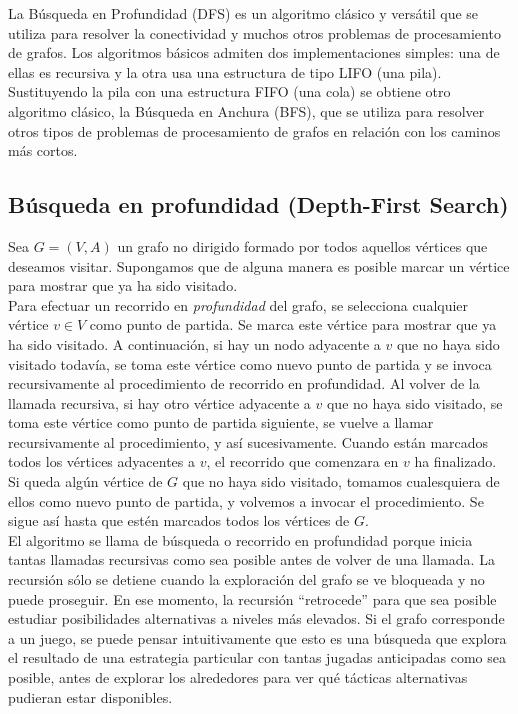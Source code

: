 La Búsqueda en Profundidad (DFS) es un algoritmo clásico y versátil que se utiliza para resolver la conectividad y muchos otros problemas de procesamiento de grafos. Los algoritmos básicos admiten dos implementaciones simples: una de ellas es recursiva y la otra usa una estructura de tipo LIFO (una pila). Sustituyendo la pila con una estructura FIFO (una cola) se obtiene otro algoritmo clásico, la Búsqueda en Anchura (BFS), que se utiliza para resolver otros tipos de problemas de procesamiento de grafos en relación con los caminos más cortos.\\

\subsection{Búsqueda en profundidad (Depth-First Search)}

Sea $G = (V,A)$ un grafo no dirigido formado por todos aquellos vértices que deseamos visitar. Supongamos que de alguna manera es posible marcar un vértice para mostrar que ya ha sido visitado. \\

Para efectuar un recorrido en \emph{profundidad} del grafo, se selecciona cualquier vértice $v \in V$ como punto de partida. Se marca este vértice para mostrar que ya ha sido visitado. A continuación, si hay un nodo adyacente a $v$ que no haya sido visitado todavía, se toma este vértice como nuevo punto de partida y se invoca recursivamente al procedimiento de recorrido en profundidad. Al volver de la llamada recursiva, si hay otro vértice adyacente a $v$ que no haya sido visitado, se toma este vértice como punto de partida siguiente, se vuelve a llamar recursivamente al procedimiento, y así sucesivamente. Cuando están marcados todos los vértices adyacentes a $v$, el recorrido que comenzara en $v$ ha finalizado. Si queda algún vértice de $G$ que no haya sido visitado, tomamos cualesquiera de ellos como nuevo punto de partida, y volvemos a invocar el procedimiento. Se sigue así hasta que estén marcados todos los vértices de $G$.\\

El algoritmo se llama de búsqueda o recorrido en profundidad porque inicia tantas llamadas recursivas como sea posible antes de volver de una llamada. La recursión sólo se detiene cuando la exploración del grafo se ve bloqueada y no puede proseguir. En ese momento, la recursión ``retrocede'' para que sea posible estudiar posibilidades alternativas a niveles más elevados. Si el grafo corresponde a un juego, se puede pensar intuitivamente que esto es una búsqueda que explora el resultado de una estrategia particular con tantas jugadas anticipadas como sea posible, antes de explorar los alrededores para ver qué tácticas alternativas pudieran estar disponibles.\\

